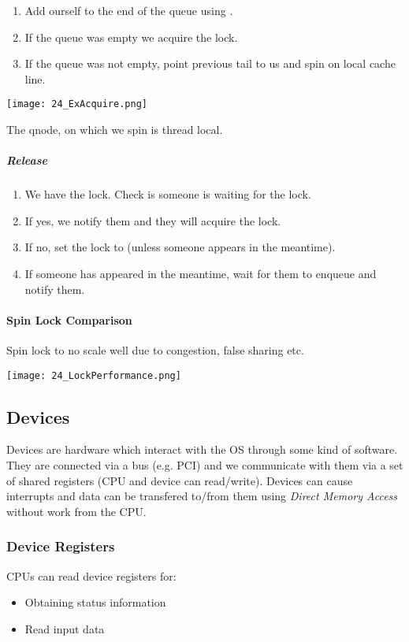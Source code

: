 \begin{enumerate}
    \item Add ourself to the end of the queue using .
    \item If the queue was empty we acquire the lock.
    \item If the queue was not empty, point previous tail to us and spin on local cache line.
\end{enumerate}

\texttt{[image: 24\_ExAcquire.png]}

The qnode, on which we spin is thread local.

\subparagraph{Release}
\begin{enumerate}
    \item We have the lock. Check is someone is waiting for the lock.
    \item If yes, we notify them and they will acquire the lock.
    \item If no, set the lock to  (unless someone appears in the meantime).
    \item If someone has appeared in the meantime, wait for them to enqueue and notify them.
\end{enumerate}

\paragraph{Spin Lock Comparison}
Spin lock to no scale well due to congestion, false sharing etc. 

\texttt{[image: 24\_LockPerformance.png]}

\subsection*{Devices}
Devices are hardware which interact with the OS through some kind of software. They are connected via a bus (e.g. PCI) and we communicate with them via a set of shared registers (CPU and device can read/write). Devices can cause interrupts and data can be transfered to/from them using \textit{Direct Memory Access} without work from the CPU.

\subsubsection{Device Registers}
CPUs can read device registers for:

\begin{itemize}
    \item Obtaining status information
    \item Read input data
\end{itemize}


